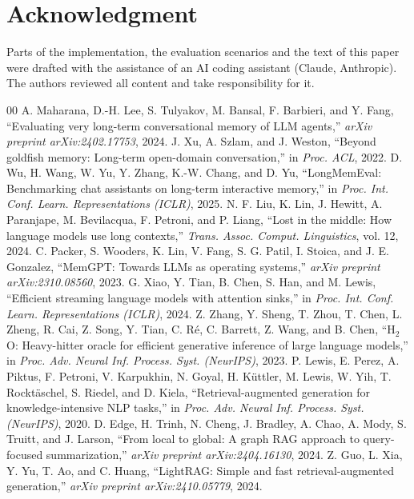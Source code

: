 \documentclass[conference]{IEEEtran}
\begin{document}
\section*{Acknowledgment}
Parts of the implementation, the evaluation scenarios and the text of this paper were drafted with the assistance of an AI coding assistant (Claude, Anthropic). The authors reviewed all content and take responsibility for it.

\begin{thebibliography}{00}
 A. Maharana, D.-H. Lee, S. Tulyakov, M. Bansal, F. Barbieri, and Y. Fang, ``Evaluating very long-term conversational memory of LLM agents,'' \textit{arXiv preprint arXiv:2402.17753}, 2024.
 J. Xu, A. Szlam, and J. Weston, ``Beyond goldfish memory: Long-term open-domain conversation,'' in \textit{Proc. ACL}, 2022.
 D. Wu, H. Wang, W. Yu, Y. Zhang, K.-W. Chang, and D. Yu, ``LongMemEval: Benchmarking chat assistants on long-term interactive memory,'' in \textit{Proc. Int. Conf. Learn. Representations (ICLR)}, 2025.
 N. F. Liu, K. Lin, J. Hewitt, A. Paranjape, M. Bevilacqua, F. Petroni, and P. Liang, ``Lost in the middle: How language models use long contexts,'' \textit{Trans. Assoc. Comput. Linguistics}, vol. 12, 2024.
 C. Packer, S. Wooders, K. Lin, V. Fang, S. G. Patil, I. Stoica, and J. E. Gonzalez, ``MemGPT: Towards LLMs as operating systems,'' \textit{arXiv preprint arXiv:2310.08560}, 2023.
 G. Xiao, Y. Tian, B. Chen, S. Han, and M. Lewis, ``Efficient streaming language models with attention sinks,'' in \textit{Proc. Int. Conf. Learn. Representations (ICLR)}, 2024.
 Z. Zhang, Y. Sheng, T. Zhou, T. Chen, L. Zheng, R. Cai, Z. Song, Y. Tian, C. R{\'e}, C. Barrett, Z. Wang, and B. Chen, ``H$_2$O: Heavy-hitter oracle for efficient generative inference of large language models,'' in \textit{Proc. Adv. Neural Inf. Process. Syst. (NeurIPS)}, 2023.
 P. Lewis, E. Perez, A. Piktus, F. Petroni, V. Karpukhin, N. Goyal, H. K{\"u}ttler, M. Lewis, W. Yih, T. Rockt{\"a}schel, S. Riedel, and D. Kiela, ``Retrieval-augmented generation for knowledge-intensive NLP tasks,'' in \textit{Proc. Adv. Neural Inf. Process. Syst. (NeurIPS)}, 2020.
 D. Edge, H. Trinh, N. Cheng, J. Bradley, A. Chao, A. Mody, S. Truitt, and J. Larson, ``From local to global: A graph RAG approach to query-focused summarization,'' \textit{arXiv preprint arXiv:2404.16130}, 2024.
 Z. Guo, L. Xia, Y. Yu, T. Ao, and C. Huang, ``LightRAG: Simple and fast retrieval-augmented generation,'' \textit{arXiv preprint arXiv:2410.05779}, 2024.

\end{thebibliography}
\end{document}
